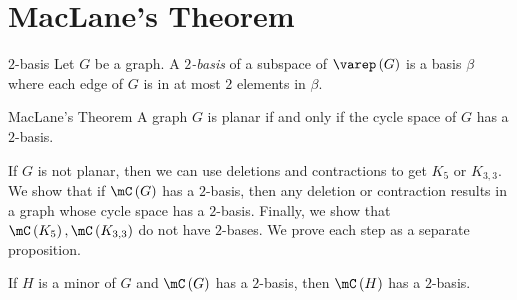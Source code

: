 \documentclass[co342]{subfiles}
\begin{document}
    \section{MacLane's Theorem}

    \begin{recall}{$2$-basis}{}
        Let $G$ be a graph. A \emph{$2$-basis} of a subspace of $\varep\left( G \right)$ is a basis $\beta$ where each edge of $G$ is in at most $2$ elements in $\beta$.
    \end{recall}

    \begin{theorem}{MacLane's Theorem}
        A graph $G$ is planar if and only if the cycle space of $G$ has a $2$-basis.
    \end{theorem}

    If $G$ is not planar, then we can use deletions and contractions to get $K_5$ or $K_{3,3}$. We show that if $\mC\left( G \right)$ has a $2$-basis, then any deletion or contraction results in a graph whose cycle space has a $2$-basis. Finally, we show that $\mC\left( K_5 \right),\mC\left( K_{3,3} \right)$ do not have $2$-bases. We prove each step as a separate proposition.

    \begin{prop}{}
        If $H$ is a minor of $G$ and $\mC\left( G \right)$ has a $2$-basis, then $\mC\left( H \right)$ has a $2$-basis.
    \end{prop}
\end{document}
